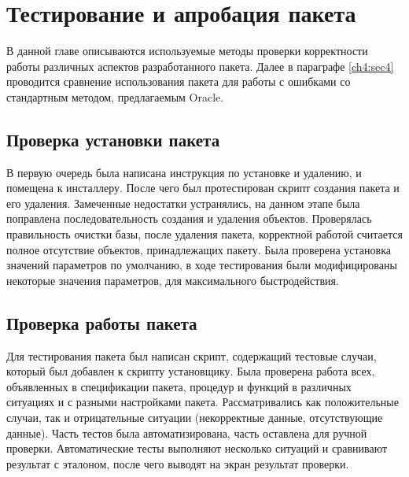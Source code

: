 \chapter{Тестирование и апробация пакета} \label{ch4}


В данной главе описываются используемые методы проверки корректности работы различных аспектов разработанного пакета. Далее в параграфе \ref{ch4:sec4} проводится сравнение использования пакета для работы с ошибками со стандартным методом, предлагаемым Oracle. 
	
\section{Проверка установки пакета} \label{ch4:sec}

В первую очередь была написана инструкция по установке и удалению, и помещена к инсталлеру. После чего был протестирован скрипт создания пакета и его удаления. Замеченные недостатки устранялись, на данном этапе была поправлена последовательность создания и удаления объектов. Проверялась правильность очистки базы, после удаления пакета, корректной работой считается полное отсутствие объектов, принадлежащих пакету. Была проверена установка значений параметров по умолчанию, в ходе тестирования были модифицированы некоторые значения параметров, для максимального быстродействия. 

\section{Проверка работы пакета} \label{ch4:sec2}

Для тестирования пакета был написан скрипт, содержащий тестовые случаи, который был добавлен к скрипту установщику. Была проверена работа всех, объявленных в спецификации пакета, процедур и функций в различных ситуациях и с разными настройками пакета. Рассматривались как положительные случаи, так и отрицательные ситуации (некорректные данные, отсутствующие данные). Часть тестов была автоматизирована, часть оставлена для ручной проверки. Автоматические тесты выполняют несколько ситуаций и сравнивают результат с эталоном, после чего выводят на экран результат проверки. 

